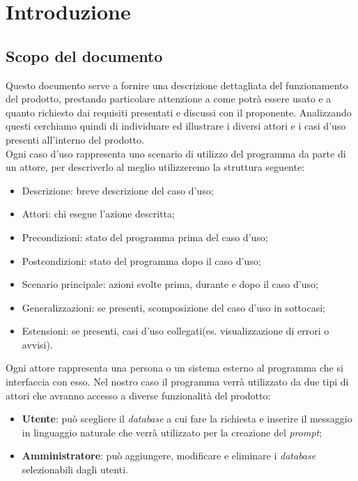 \section{Introduzione}
\subsection{Scopo del documento}
Questo documento serve a fornire una descrizione dettagliata del funzionamento del prodotto, prestando particolare attenzione a come potrà essere usato e a quanto richiesto dai requisiti presentati e discussi con il proponente.
Analizzando questi cerchiamo quindi di individuare ed illustrare i diversi attori e i casi d’uso presenti all’interno del prodotto.\\
Ogni caso d’uso rappresenta uno scenario di utilizzo del programma da parte di un attore, per descriverlo al meglio utilizzeremo la struttura seguente:
\begin{itemize}
	\item Descrizione: breve descrizione del caso d'uso;
	\item Attori: chi esegue l'azione descritta;
	\item Precondizioni: stato del programma prima del caso d'uso;
	\item Postcondizioni: stato del programma dopo il caso d'uso;
	\item Scenario principale: azioni svolte prima, durante e dopo il caso d'uso;
	\item Generalizzazioni: se presenti, scomposizione del caso d'uso in sottocasi;
	\item Estensioni: se presenti, casi d'uso collegati(es. visualizzazione di errori o avvisi).
\end{itemize}
Ogni attore rappresenta una persona o un sistema esterno al programma che si interfaccia con esso.
Nel nostro caso il programma verrà utilizzato da due tipi di attori che avranno accesso a diverse funzionalità del prodotto:
\begin{itemize}
	\item \textbf{Utente}: può scegliere il \textit{database} a cui fare la richiesta e inserire il messaggio in linguaggio naturale che verrà utilizzato per la creazione del \textit{prompt};
	\item \textbf{Amministratore}: può aggiungere, modificare e eliminare i \textit{database} selezionabili dagli utenti.
\end{itemize} %

